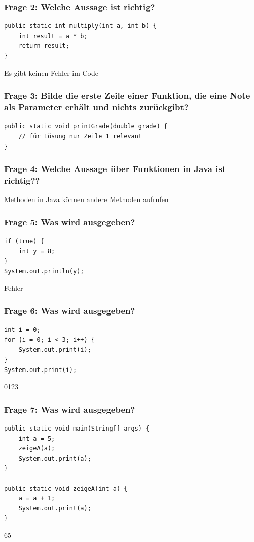 \documentclass{../../presentation}
\begin{document}
\begin{frame}[fragile]
  \frametitle{Frage 2: Welche Aussage ist richtig?}
  \begin{verbatim}
public static int multiply(int a, int b) {
    int result = a * b;
    return result;
}
  \end{verbatim}
  \begin{ausgabe}
    Es gibt keinen Fehler im Code
  \end{ausgabe}
\end{frame}

\begin{frame}[fragile]
  \frametitle{Frage 3: Bilde die erste Zeile einer Funktion, die eine Note als Parameter erhält und nichts zurückgibt?}
  \begin{verbatim}
public static void printGrade(double grade) {
    // für Lösung nur Zeile 1 relevant
}

  \end{verbatim}
\end{frame}

\begin{frame}[fragile]
  \frametitle{Frage 4: Welche Aussage über Funktionen in Java ist richtig??}
  \begin{ausgabe}
    Methoden in Java können andere Methoden aufrufen
  \end{ausgabe}
\end{frame}

\begin{frame}[fragile]
  \frametitle{Frage 5: Was wird ausgegeben?}
  \begin{verbatim}
if (true) {
    int y = 8;
}
System.out.println(y);

  \end{verbatim}
  \begin{ausgabe}
    Fehler
  \end{ausgabe}
\end{frame}

\begin{frame}[fragile]
  \frametitle{Frage 6: Was wird ausgegeben?}
  \begin{verbatim}
int i = 0;
for (i = 0; i < 3; i++) {
    System.out.print(i);
}
System.out.print(i);
  \end{verbatim}
  \begin{ausgabe}
    0123
  \end{ausgabe}
\end{frame}

\begin{frame}[fragile]
  \frametitle{Frage 7: Was wird ausgegeben?}
  \begin{verbatim}
public static void main(String[] args) {
    int a = 5;
    zeigeA(a);
    System.out.print(a);
}

public static void zeigeA(int a) {
    a = a + 1;
    System.out.print(a);
}
  \end{verbatim}
  \begin{ausgabe}
    65
  \end{ausgabe}
\end{frame}
\end{document}
